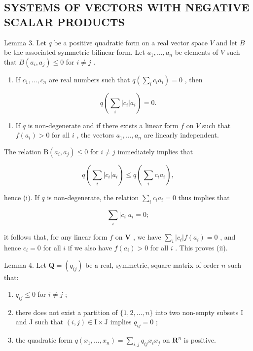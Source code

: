 \subsection{SYSTEMS OF VECTORS WITH NEGATIVE SCALAR PRODUCTS}

Lemma 3. Let \(q\) be a positive quadratic form on a real vector space \(V\) and let \(B\) be the associated symmetric bilinear form. Let \(a_1, \ldots, a_n\) be elements of \(V\) such that \(B(a_i, a_j) \leqslant 0\) for \(i \neq j\) .

\begin{enumerate}
\def\labelenumi{(\roman{enumi})}
\tightlist
\item
  If \(c_{1}, \ldots, c_{n}\) are real numbers such that \(q\left(\sum_{i} c_{i} a_{i}\right) = 0\) , then
\end{enumerate}

\[
q \left(\sum_ {i} | c _ {i} | a _ {i}\right) = 0.
\]

\begin{enumerate}
\def\labelenumi{(\roman{enumi})}
\setcounter{enumi}{1}
\tightlist
\item
  If \(q\) is non-degenerate and if there exists a linear form \(f\) on \(V\) such that \(f(a_i) > 0\) for all \(i\) , the vectors \(a_1, \ldots, a_n\) are linearly independent.
\end{enumerate}

The relation \(\mathrm{B}(a_i, a_j) \leqslant 0\) for \(i \neq j\) immediately implies that

\[
q \left(\sum_ {i} | c _ {i} | a _ {i}\right) \leqslant q \left(\sum_ {i} c _ {i} a _ {i}\right),
\]

hence (i). If \(q\) is non-degenerate, the relation \(\sum_{i} c_{i} a_{i} = 0\) thus implies that

\[
\sum_ {i} | c _ {i} | a _ {i} = 0;
\]

it follows that, for any linear form \(f\) on \(\mathbf{V}\) , we have \(\sum_{i}|c_i|f(a_i) = 0\) , and hence \(c_i = 0\) for all \(i\) if we also have \(f(a_i) > 0\) for all \(i\) . This proves (ii).

Lemma 4. Let \(\mathbf{Q} = (q_{ij})\) be a real, symmetric, square matrix of order \(n\) such that:

\begin{enumerate}
\def\labelenumi{\alph{enumi})}
\item
  \(q_{ij} \leqslant 0\) for \(i \neq j\) ;
\item
  there does not exist a partition of \(\{1,2,\ldots,n\}\) into two non-empty subsets I and J such that \((i,j)\in\mathrm{I}\times\mathrm{J}\) implies \(q_{ij}=0\) ;
\item
  the quadratic form \(q(x_{1},\ldots ,x_{n}) = \sum_{i,j}q_{ij}x_{i}x_{j}\) on \(\mathbf{R}^n\) is positive.
\end{enumerate}

